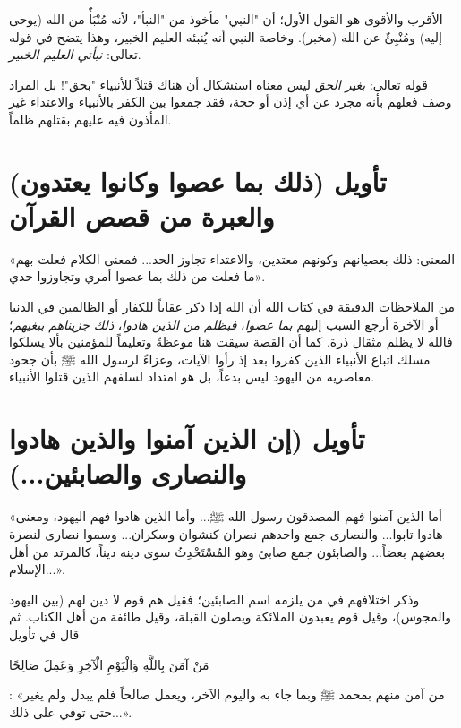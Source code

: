 \begin{fawaid}
الأقرب والأقوى هو القول الأول؛ أن "النبي" مأخوذ من "النبأ"، لأنه مُنْبَأٌ من الله (يوحى إليه) ومُنْبِئٌ عن الله (مخبر). وخاصة النبي أنه يُنبئه العليم الخبير، وهذا يتضح في قوله تعالى: \textit{نبأني العليم الخبير}.
\end{fawaid}

\begin{fawaid}
قوله تعالى: \textit{بغير الحق} ليس معناه استشكال أن هناك قتلاً للأنبياء "بحق"! بل المراد وصف فعلهم بأنه مجرد عن أي إذن أو حجة، فقد جمعوا بين الكفر بالأنبياء والاعتداء غير المأذون فيه عليهم بقتلهم ظلماً.
\end{fawaid}

\separator

\section{تأويل (ذلك بما عصوا وكانوا يعتدون) والعبرة من قصص القرآن}
 «المعنى: ذلك بعصيانهم وكونهم معتدين، والاعتداء تجاوز الحد... فمعنى الكلام فعلت بهم ما فعلت من ذلك بما عصوا أمري وتجاوزوا حدي».

\begin{fawaid}
من الملاحظات الدقيقة في كتاب الله أن الله إذا ذكر عقاباً للكفار أو الظالمين في الدنيا أو الآخرة أرجع السبب إليهم \textit{بما عصوا}، \textit{فبظلم من الذين هادوا}، \textit{ذلك جزيناهم ببغيهم}؛ فالله لا يظلم مثقال ذرة. 
كما أن القصة سيقت هنا موعظةً وتعليماً للمؤمنين بألا يسلكوا مسلك اتباع الأنبياء الذين كفروا بعد إذ رأوا الآيات، وعزاءً لرسول الله ﷺ بأن جحود معاصريه من اليهود ليس بدعاً، بل هو امتداد لسلفهم الذين قتلوا الأنبياء.
\end{fawaid}

\separator

\section{تأويل (إن الذين آمنوا والذين هادوا والنصارى والصابئين...)}
 «أما الذين آمنوا فهم المصدقون رسول الله ﷺ... وأما الذين هادوا فهم اليهود، ومعنى هادوا تابوا... والنصارى جمع واحدهم نصران كنشوان وسكران... وسموا نصارى لنصرة بعضهم بعضاً... والصابئون جمع صابئ وهو المُسْتَحْدِثُ سوى دينه ديناً، كالمرتد من أهل الإسلام...».

وذكر اختلافهم في من يلزمه اسم الصابئين؛ فقيل هم قوم لا دين لهم (بين اليهود والمجوس)، وقيل قوم يعبدون الملائكة ويصلون القبلة، وقيل طائفة من أهل الكتاب. 
ثم قال في تأويل \begin{ayah}مَنْ آمَنَ بِاللَّهِ وَالْيَوْمِ الْآخِرِ وَعَمِلَ صَالِحًا\end{ayah}: «من آمن منهم بمحمد ﷺ وبما جاء به واليوم الآخر، ويعمل صالحاً فلم يبدل ولم يغير حتى توفي على ذلك...».

